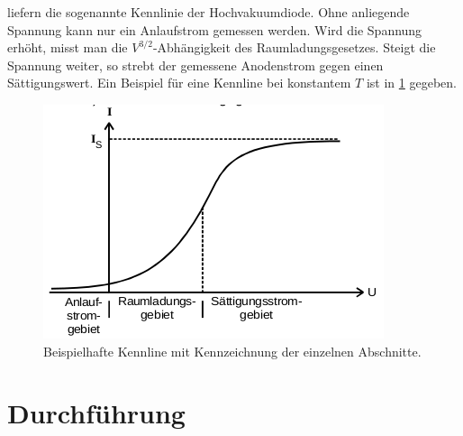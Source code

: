 liefern die sogenannte Kennlinie der Hochvakuumdiode. Ohne anliegende Spannung kann nur
ein Anlaufstrom gemessen werden. Wird die Spannung erhöht, misst man die $V^{3/2}$-Abhängigkeit
des Raumladungsgesetzes. Steigt die Spannung weiter, so strebt der gemessene Anodenstrom gegen
einen Sättigungswert. Ein Beispiel für eine Kennline bei konstantem $T$ ist in \ref{abb:6}
gegeben.
\begin{figure}
  \centering
  \includegraphics[scale=0.4]{kennlinie.png}
  \caption{Beispielhafte Kennline mit Kennzeichnung der einzelnen Abschnitte\cite{anleitung}.}
  \label{abb:6}
\end{figure}
\section{Durchführung}
